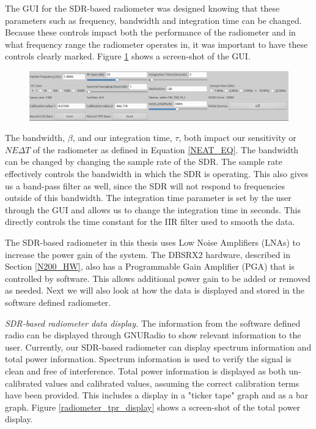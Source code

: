 The GUI for the SDR-based radiometer was designed knowing that these parameters such as frequency, bandwidth and integration time can be changed.  Because these controls impact both the performance of the radiometer and in what frequency range the radiometer operates in, it was important to have these controls clearly marked.  Figure \ref{radiometer_gui} shows a screen-shot of the GUI.

{\begin{figure}[h!tb] 
\centering
\includegraphics[width=16cm]{Images/radiometer_gui.png}
\label{radiometer_gui}
\end{figure}
}

The bandwidth, $\beta$, and our integration time, $\tau$, both impact our sensitivity or $NE\Delta T$ of the radiometer as defined in Equation \ref{NEAT_EQ}.  The bandwidth can be changed by changing the sample rate of the SDR.  The sample rate effectively controls the bandwidth in which the SDR is operating.  This also gives us a band-pass filter as well, since the SDR will not respond to frequencies outside of this bandwidth.  The integration time parameter is set by the user through the GUI and allows us to change the integration time in seconds.  This directly controls the time constant for the IIR filter used to smooth the data.

The SDR-based radiometer in this thesis uses Low Noise Amplifiers (LNAs) to increase the power gain of the system.  The DBSRX2 hardware, described in Section \ref{N200_HW}, also has a Programmable Gain Amplifier (PGA) that is controlled by software.  This allows additional power gain to be added or removed as needed.  Next we will also look at how the data is displayed and stored in the software defined radiometer.

\emph{SDR-based radiometer data display.}  The information from the software defined radio can be displayed through GNURadio to show relevant information to the user.  Currently, our SDR-based radiometer can display spectrum information and total power information.  Spectrum information is used to verify the signal is clean and free of interference. Total power information is displayed as both un-calibrated values and calibrated values, assuming the correct calibration terms have been provided.  This includes a display in a "ticker tape" graph and as a bar graph.  Figure \ref{radiometer_tpr_display} shows a screen-shot of the total power display.  

